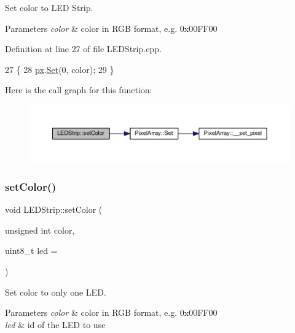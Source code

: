 Set color to L\+ED Strip. 


\begin{DoxyParams}{Parameters}
{\em color} & color in R\+GB format, e.\+g. 0x00\+F\+F00 \\
\hline
\end{DoxyParams}


Definition at line 27 of file L\+E\+D\+Strip.\+cpp.


\begin{DoxyCode}
27                                           \{
28     \hyperlink{class_l_e_d_strip_aa8a8764862dbb64aedc0b53cfe3fc22b}{px}.\hyperlink{class_pixel_array_afcfe32b74beeced27f928f42131d77c1}{Set}(0, color);
29 \}
\end{DoxyCode}
Here is the call graph for this function\+:\nopagebreak
\begin{figure}[H]
\begin{center}
\leavevmode
\includegraphics[width=350pt]{class_l_e_d_strip_a310b381acdd83a01ddb6e2debebbbc7c_cgraph}
\end{center}
\end{figure}
\mbox{\label{class_l_e_d_strip_a1f9d9c2784c9ad893163f7f17e603ce7}} 
\subsubsection{\texorpdfstring{set\+Color()}{setColor()}\hspace{0.1cm}{\footnotesize\ttfamily [2/2]}}
{\footnotesize\ttfamily void L\+E\+D\+Strip\+::set\+Color (\begin{DoxyParamCaption}\item[{unsigned int}]{color,  }\item[{uint8\+\_\+t}]{led = {} }\end{DoxyParamCaption})}



Set color to only one L\+ED. 


\begin{DoxyParams}{Parameters}
{\em color} & color in R\+GB format, e.\+g. 0x00\+F\+F00 \\
\hline
{\em led} & id of the L\+ED to use \\
\hline
\end{DoxyParams}


